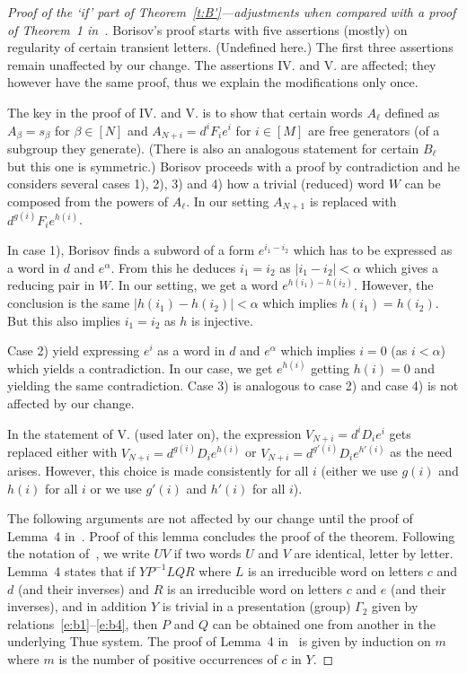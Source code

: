 \documentclass[10pt,a4paper]{article}
\theoremstyle{definition}
\theoremstyle{remark}
\newcommand{\bequal}{$\raisebox{1pt}{$\kern1.5mm
  {\scriptscriptstyle\circ}\kern-2.1mm\rule[-.4mm]{3mm}{.5pt}\kern-3mm\rule[1.2mm]{3mm}{.5pt}\kern1mm$}$}
\begin{document}
\begin{proof}[Proof of the `if' part of Theorem~\ref{t:B'}---adjustments
  when compared with a proof of Theorem~1 in~\cite{borisov69}]

  Borisov's proof starts with five assertions (mostly) on regularity of certain
  transient letters. (Undefined here.) The first three assertions remain
  unaffected by our change. The assertions IV. and V. are affected; they
  however have the same proof, thus we explain the modifications only once.

 The key in the proof of IV. and V. is to show that certain words $A_\ell$
  defined as $A_\beta = s_\beta$ for $\beta \in [N]$ and $A_{N+i} = d^i F_i
  e^i$ for $i \in [M]$ are free generators (of a subgroup they generate). (There
  is also an analogous statement for certain $B_\ell$ but this one is
  symmetric.) Borisov proceeds with a proof by contradiction and he considers
  several cases 1), 2), 3) and 4) how a trivial (reduced) word $W$ can be composed from the powers of $A_\ell$. In our setting $A_{N+1}$ is replaced with $d^{g(i)} F_i
  e^{h(i)}$. 

  In case 1), Borisov finds a subword of a form $e^{i_1-i_2}$ which has to be
  expressed as a word in $d$ and $e^{\alpha}$. From this he deduces $i_1=i_2$
  as $|i_1 - i_2| < \alpha$ which gives a reducing pair in $W$. In our setting,
  we get a word $e^{h(i_1) - h(i_2)}$. However, the conclusion is the same
  $|h(i_1) - h(i_2)| < \alpha$ which implies $h(i_1) = h(i_2)$. But this also
  implies $i_1 = i_2$ as $h$ is injective.

  Case 2) yield expressing $e^i$ as a word in $d$ and $e^{\alpha}$ which
  implies $i = 0$ (as $i < \alpha$) which yields a contradiction. In our case,
  we get $e^{h(i)}$ getting $h(i)=0$ and yielding the same contradiction. Case
  3) is analogous to case 2) and case 4) is not affected by our change.

  In the statement of V. (used later on), the expression $V_{N+i} = d^i D_ie^i$
  gets replaced either with $V_{N+i} = d^{g(i)} D_ie^{h(i)}$ or $V_{N+i} =
  d^{g'(i)} D_ie^{h'(i)}$ as the need arises. However, this choice is made
  consistently for all $i$ (either we use $g(i)$ and $h(i)$ for all $i$ or we
  use $g'(i)$ and $h'(i)$ for all $i$).

\medskip

The following arguments are not affected by our change until the proof of
  Lemma~4 in~\cite{borisov69}. Proof of this lemma concludes the proof of the
  theorem.  Following the notation of~\cite{borisov69}, we write $U \bequal V$ if two
  words $U$ and $V$ are identical, letter by letter. Lemma~4 states that if $Y
  \bequal P^{-1}LQR$ where $L$ is an irreducible word on letters $c$ and $d$
  (and their inverses) and $R$ is an irreducible word on letters $c$ and $e$
  (and their inverses), and in addition $Y$ is trivial in a presentation
  (group) $\Gamma_2$
  given by relations~\eqref{e:b1}--\eqref{e:b4}, then $P$ and $Q$ can be
  obtained one from another in the underlying Thue system. The proof of Lemma~4
  in~\cite{borisov69} is given by induction on $m$ where $m$ is the number of
  positive occurrences of $c$ in $Y$.


\end{proof}
\end{document}
